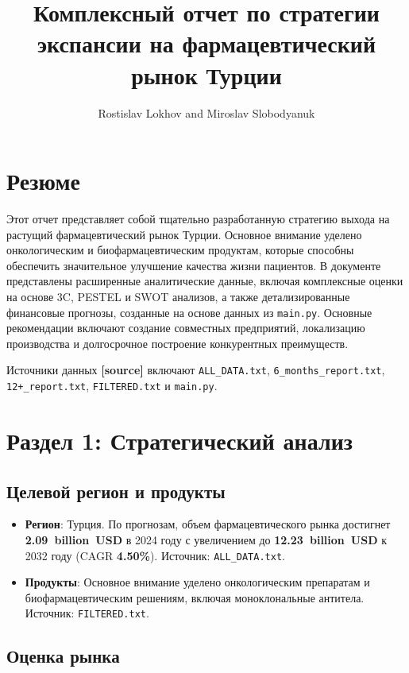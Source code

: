\documentclass[a4paper,12pt]{article}
\title{Комплексный отчет по стратегии экспансии на фармацевтический рынок Турции}
\author{Rostislav Lokhov and Miroslav Slobodyanuk}
\date{}
\begin{document}
\maketitle

\section*{Резюме}
Этот отчет представляет собой тщательно разработанную стратегию выхода на растущий фармацевтический рынок Турции. Основное внимание уделено онкологическим и биофармацевтическим продуктам, которые способны обеспечить значительное улучшение качества жизни пациентов. В документе представлены расширенные аналитические данные, включая комплексные оценки на основе 3C, PESTEL и SWOT анализов, а также детализированные финансовые прогнозы, созданные на основе данных из \texttt{main.py}. Основные рекомендации включают создание совместных предприятий, локализацию производства и долгосрочное построение конкурентных преимуществ.

Источники данных \textbf{[source]} включают \texttt{ALL\_DATA.txt}, \texttt{6\_months\_report.txt}, \texttt{12+\_report.txt}, \texttt{FILTERED.txt} и \texttt{main.py}.

\section{Раздел 1: Стратегический анализ}

\subsection{Целевой регион и продукты}
\begin{itemize}
    \item \textbf{Регион}: Турция. По прогнозам, объем фармацевтического рынка достигнет \textbf{2.09~billion~USD} в 2024 году с увеличением до \textbf{12.23~billion~USD} к 2032 году (CAGR \textbf{4.50\%}). Источник: \texttt{ALL\_DATA.txt}.
    \item \textbf{Продукты}: Основное внимание уделено онкологическим препаратам и биофармацевтическим решениям, включая моноклональные антитела. Источник: \texttt{FILTERED.txt}.
\end{itemize}

\subsection{Оценка рынка}
\end{document}
